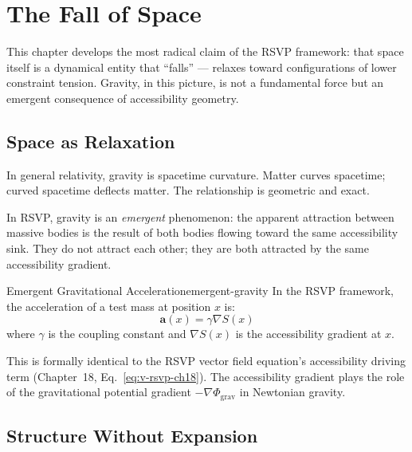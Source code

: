 \chapter{The Fall of Space}



This chapter develops the most radical claim of the RSVP framework:
that space itself is a dynamical entity that ``falls'' — relaxes toward
configurations of lower constraint tension. Gravity, in this picture,
is not a fundamental force but an emergent consequence of accessibility
geometry.

\section{Space as Relaxation}

In general relativity, gravity is spacetime curvature. Matter curves
spacetime; curved spacetime deflects matter. The relationship is
geometric and exact.

In RSVP, gravity is an \emph{emergent} phenomenon: the apparent attraction
between massive bodies is the result of both bodies flowing toward the
same accessibility sink. They do not attract each other; they are both
attracted by the same accessibility gradient.

\begin{definition}{Emergent Gravitational Acceleration}{emergent-gravity}
  In the RSVP framework, the acceleration of a test mass at position $x$
  is:
  \[
    \mathbf{a}(x) = \gamma \nabla S(x)
  \]
  where $\gamma$ is the coupling constant and $\nabla S(x)$ is the
  accessibility gradient at $x$.
\end{definition}

This is formally identical to the RSVP vector field equation's
accessibility driving term (Chapter~18, Eq.~\ref{eq:v-rsvp-ch18}).
The accessibility gradient plays the role of the gravitational potential
gradient $-\nabla \Phi_\text{grav}$ in Newtonian gravity.

\section{Structure Without Expansion}

